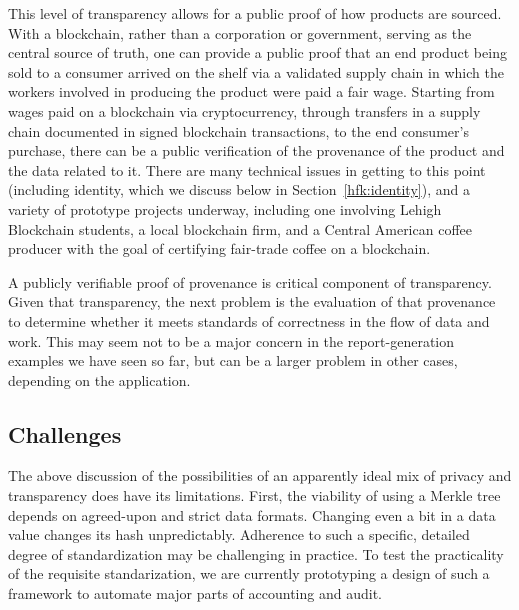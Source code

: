 \documentclass[11pt,dvipdfm]{article}
\begin{document}
This level of transparency allows for a public proof of how products are sourced.  With a blockchain, rather than
a corporation or government, serving as the central source of truth, one can provide a public proof that an end
product being sold to a consumer arrived on the shelf via a validated supply chain in which the workers
involved in producing the product were paid a fair wage.  Starting from wages paid on a blockchain via cryptocurrency, through
transfers in a supply chain documented in signed blockchain transactions, to the end consumer's purchase, there
can be a public verification of the provenance of the product and the data related to it.
There are many technical issues in getting to this point (including identity, which we discuss below in
Section~\ref{hfk:identity}), and a variety of prototype projects underway, including one involving Lehigh
Blockchain students, a local blockchain firm, and a Central American coffee producer with the goal of
certifying fair-trade coffee on a blockchain. 

A publicly verifiable proof of provenance is critical component of transparency.
Given that transparency, the next problem is the evaluation of that provenance to determine whether it meets
standards of correctness in the flow of data and work. 
This may seem not to be a major concern in the report-generation examples we have seen so far, but can be
a larger problem in other cases, depending on the application.

\subsection {Challenges}
The above discussion of the possibilities of an apparently ideal mix of privacy and transparency does have its limitations.
First, the viability of using a Merkle tree depends on agreed-upon and strict data formats.  Changing even a bit in a
data value changes its hash unpredictably.  Adherence to such a specific, detailed degree of standardization may be 
challenging in practice.  To test the practicality of the requisite standarization, we are currently prototyping a design of such a framework to automate major parts of
accounting and audit.\cite{snow}
\end{document}
